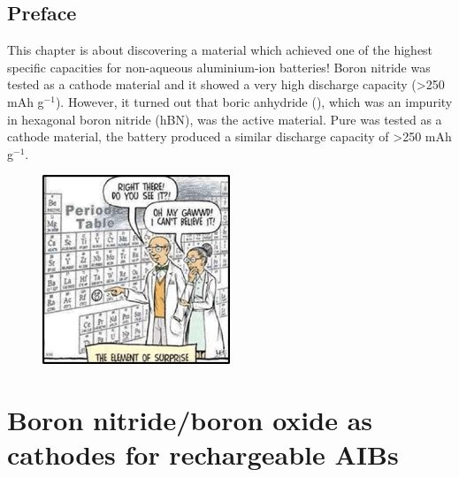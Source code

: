 \section*{Preface}
This chapter is about discovering a material which achieved one of the highest specific capacities for non-aqueous aluminium-ion batteries! Boron nitride was tested as a cathode material and it showed a very high discharge capacity (>250 mAh g$^{-1}$). However, it turned out that boric anhydride (), which was an impurity in hexagonal boron nitride (hBN), was the active material. Pure  was tested as a cathode material, the battery produced a similar discharge capacity of >250 mAh g$^{-1}$.   

\begin{figure}[tbh!]
\centering
\includegraphics[width=0.5\textwidth]{Figures/BOhBN/ah}
\end{figure}

\newpage
\chapter{Boron nitride/boron oxide as cathodes for rechargeable AIBs} 
\label{BOhBN} 

